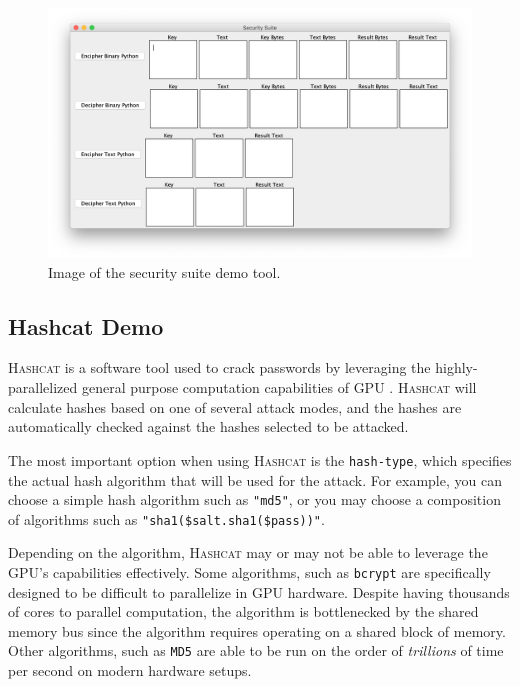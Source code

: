 \documentclass[acmlarge]{acmart}
\begin{document}
\begin{figure}
  \centering
  \includegraphics[scale=0.40]{demo}
  \caption{Image of the security suite demo tool.}
  \label{fig:one}
\end{figure}

\subsection{Hashcat Demo}\label{sec:hashcat}

\textsc{Hashcat} is a software tool used to crack passwords by leveraging the highly-parallelized general purpose computation capabilities of GPU \cite{Hashcat}. \textsc{Hashcat} will calculate hashes based on one of several attack modes, and the hashes are automatically checked against the hashes selected to be attacked.

The most important option when using \textsc{Hashcat} is the \texttt{hash-type}, which specifies the actual hash algorithm that will be used for the attack. For example, you can choose a simple hash algorithm such as \texttt{"md5"}, or you may choose a composition of algorithms such as \texttt{"sha1(\$salt.sha1(\$pass))"}.

Depending on the algorithm, \textsc{Hashcat} may or may not be able to leverage the GPU's capabilities effectively. Some algorithms, such as \texttt{bcrypt} are specifically designed to be difficult to parallelize in GPU hardware. Despite having thousands of cores to parallel computation, the algorithm is bottlenecked by the shared memory bus since the algorithm requires operating on a shared block of memory. Other algorithms, such as \texttt{MD5} are able to be run on the order of \textit{trillions} of time per second on modern hardware setups.
\end{document}
